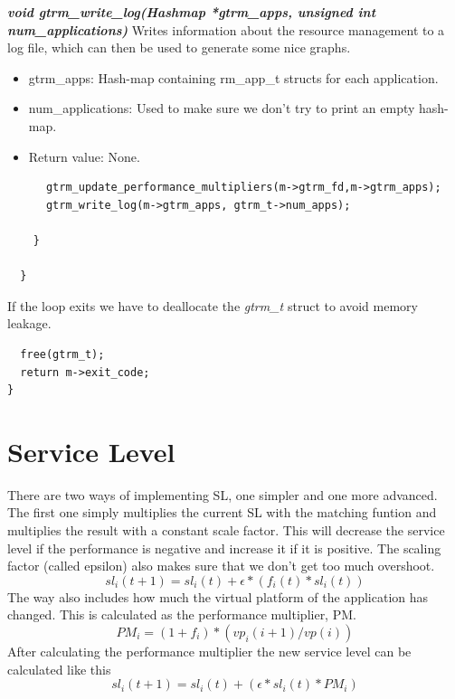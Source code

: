 \documentclass[nobiblatex]{LTHthesis}
\begin{document}
\begin{framed}
		\begin{flushleft}
				\textbf{\emph{{void gtrm\_write\_log(Hashmap *gtrm\_apps, unsigned int num\_applications)}}} \newline
				Writes information about the resource management to a log file, which can then be used to generate some nice graphs.
				\begin{itemize} 
				\item gtrm\_apps: Hash-map containing rm\_app\_t structs for each application.
				\item num\_applications: Used to make sure we don't try to print an empty hash-map.
				\item Return value: None.
		\end{itemize}

		\end{flushleft}	
\end{framed}




\begin{verbatim}
      gtrm_update_performance_multipliers(m->gtrm_fd,m->gtrm_apps);
      gtrm_write_log(m->gtrm_apps, gtrm_t->num_apps);

    }

  }
\end{verbatim}
If the loop exits we have to deallocate the \emph{gtrm\_t} struct to avoid memory leakage.
\begin{verbatim}
  free(gtrm_t);
  return m->exit_code;
}
\end{verbatim}

\section{Service Level}
There are two ways of implementing SL, one simpler and one more advanced. The first one simply multiplies the current SL with the matching funtion and multiplies the result with a constant scale factor. This will decrease the service level if the performance is negative and increase it if it is positive. The scaling factor (called epsilon) also makes sure that we don't get too much overshoot. 
\[sl_i(t+1)= sl_i(t) + \epsilon*(f_i(t)*sl_i(t)) \]
The way also includes how much the virtual platform of the application has changed. This is calculated as the performance multiplier, PM.
\[PM_i = (1+f_i)*(vp_i(i+1)/vp(i))\]
After calculating the performance multiplier the new service level can be calculated like this
\[sl_i(t+1)=sl_i(t) + (\epsilon*sl_i(t)*PM_i)\]
\end{document}
